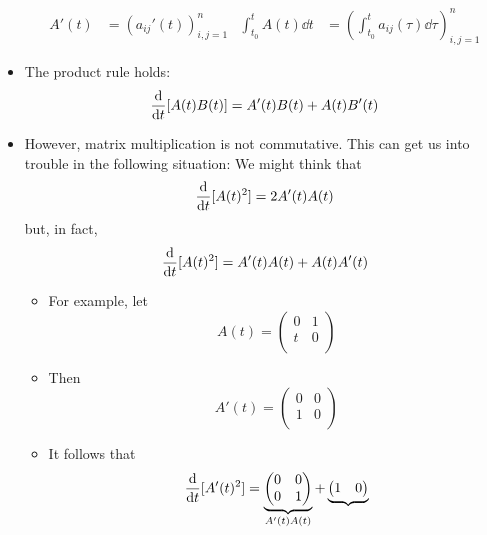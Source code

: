 \documentclass[../notes.tex]{subfiles}
\begin{document}
\begin{itemize}
    \begin{align*}
        A'(t) &= (a_{ij}'(t))_{i,j=1}^n&
        \int_{t_0}^tA(t)\dd{t} &= \left( \int_{t_0}^ta_{ij}(\tau)\dd\tau \right)_{i,j=1}^n
    \end{align*}
    \item The product rule holds:
    \begin{equation*}
        \dv{t}[A(t)B(t)] = A'(t)B(t)+A(t)B'(t)
    \end{equation*}
    \item However, matrix multiplication is not commutative. This can get us into trouble in the following situation: We might think that
    \begin{equation*}
        \dv{t}[A(t)^2] = 2A'(t)A(t)
    \end{equation*}
    but, in fact,
    \begin{equation*}
        \dv{t}[A(t)^2] = A'(t)A(t)+A(t)A'(t)
    \end{equation*}
    \begin{itemize}
        \item For example, let
        \begin{equation*}
            A(t) =
            \begin{pmatrix}
                0 & 1\\
                t & 0\\
            \end{pmatrix}
        \end{equation*}
        \item Then
        \begin{equation*}
            A'(t) =
            \begin{pmatrix}
                0 & 0\\
                1 & 0\\
            \end{pmatrix}
        \end{equation*}
        \item It follows that
        \begin{equation*}
            \dv{t}[A'(t)^2] = \underbrace{
                \begin{pmatrix}
                    0 & 0\\
                    0 & 1\\
                \end{pmatrix}
            }_{A'(t)A(t)}+\underbrace{
                \begin{pmatrix}
                    1 & 0\\

\end{pmatrix}}
\end{equation*}
\end{itemize}
\end{itemize}
\end{document}
